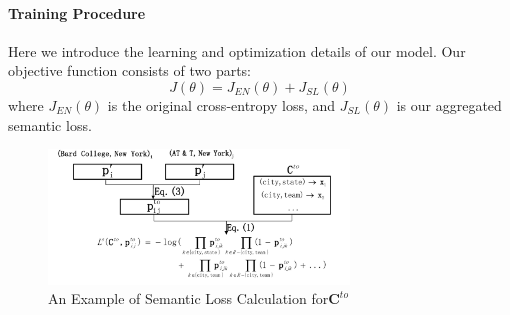\paragraph{Training Procedure}
Here we introduce the learning and optimization details of our model. Our objective function consists of two parts:
\begin{equation}
	J(\theta) = J_{EN}(\theta) + J_{SL}(\theta)
\end{equation}
where  $J_{EN}(\theta)$ is the original cross-entropy  loss, and $J_{SL}(\theta)$ is our aggregated semantic loss.




\begin{figure}
	\centering
	\includegraphics[width=8cm]{./result-figure/example.pdf}
	\vspace{-2em}
	\caption{{\small An Example of Semantic Loss Calculation for\hspace{0.1em}$\bm{C}^{to}$}}
	\label{fig:example}
	\vspace{-1.5em}
\end{figure}


